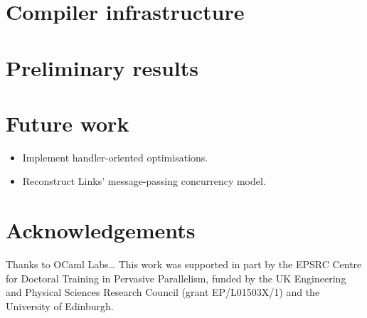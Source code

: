 \documentclass[noback,landscape]{infposter}
\begin{document}
\section{Compiler infrastructure}

\section{Preliminary results}
\lipsum[75]
\section{Future work}

\begin{itemize}
  \item Implement handler-oriented optimisations.
  \item Reconstruct Links' message-passing concurrency model.
\end{itemize}

\section{Acknowledgements}
Thanks to OCaml Labs\dots
This work was supported in part by the EPSRC Centre for Doctoral Training in Pervasive Parallelism, funded by the UK Engineering and Physical Sciences Research Council (grant EP/L01503X/1) and the University of Edinburgh.
\end{document}
